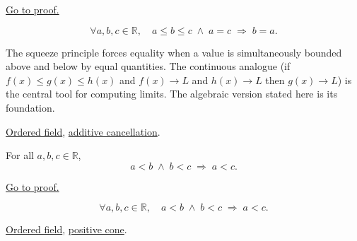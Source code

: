 \begin{remark*}[Proof]
\hyperref[prf:ineq-squeeze]{Go to proof.}
\end{remark*}

\begin{remark*}
\[
  \forall a, b, c \in \mathbb{R},\quad
  a \le b \le c \;\land\; a = c \;\Rightarrow\; b = a.
\]
\end{remark*}

\begin{remark*}[Interpretation]
The squeeze principle forces equality when a value is simultaneously
bounded above and below by equal quantities.  The continuous analogue
(if $f(x) \le g(x) \le h(x)$ and $f(x) \to L$ and $h(x) \to L$ then
$g(x) \to L$) is the central tool for computing limits.  The algebraic
version stated here is its foundation.
\end{remark*}

\begin{dependencies}
\hyperref[def:real-ordered-field]{Ordered field},
\hyperref[cor:additive-cancellation-on-q]{additive cancellation}.
\end{dependencies}


\begin{theorem}
\label{thm:ineq-transitivity-strict}
For all $a, b, c \in \mathbb{R}$,
\[
  a < b \;\land\; b < c \;\Rightarrow\; a < c.
\]
\end{theorem}



\begin{remark*}[Proof]
\hyperref[prf:ineq-transitivity-strict]{Go to proof.}
\end{remark*}

\begin{remark*}
\[
  \forall a, b, c \in \mathbb{R},\quad
  a < b \;\land\; b < c \;\Rightarrow\; a < c.
\]
\end{remark*}

\begin{dependencies}
\hyperref[def:real-ordered-field]{Ordered field},
\hyperref[def:positive-cone]{positive cone}.
\end{dependencies}


